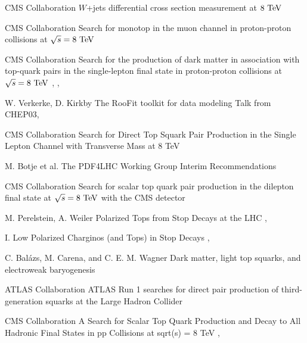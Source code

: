 {CMS Collaboration}
{$W$+jets differential cross section measurement at $8~\text{TeV}$}
{}

{CMS Collaboration}
{Search for monotop in the muon channel in proton-proton collisions at $\sqrt{s} = 8~\text{TeV}$}
{}

{CMS Collaboration}
{Search for the production of dark matter in association with top-quark pairs
in the single-lepton final state in proton-proton collisions at $\sqrt{s} = 8~\text{TeV}$}
{, , }

{W. Verkerke, D. Kirkby}
{The RooFit toolkit for data modeling}
{Talk from CHEP03, }


{CMS Collaboration}
{Search for Direct Top Squark Pair Production in the Single Lepton Channel
with Transverse Mass at 8 TeV}
{}

{M. Botje et al.}
{The PDF4LHC Working Group Interim Recommendations}
{}


{CMS Collaboration}
{Search for scalar top quark pair production in the dilepton
final state at $\sqrt{s} = 8~\text{TeV}$ with the CMS detector}
{}

{M. Perelstein, A. Weiler}
{Polarized Tops from Stop Decays at the LHC}
{, }

{I. Low}
{Polarized Charginos (and Tops) in Stop Decays}
{, }

{C. Balázs, M. Carena, and C. E. M. Wagner}
{Dark matter, light top squarks, and electroweak baryogenesis}
{}

{ATLAS Collaboration}
{ATLAS Run 1 searches for direct pair production of third-generation squarks at the Large Hadron Collider}
{}

{CMS Collaboration}
{A Search for Scalar Top Quark Production and Decay to All Hadronic Final States in pp Collisions at sqrt(s) = 8 TeV}
{, }

